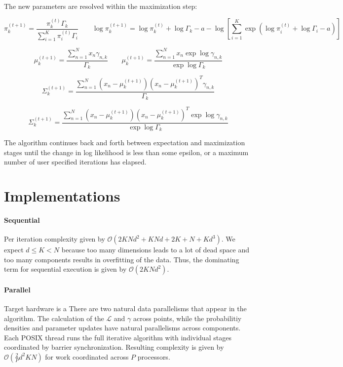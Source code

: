 \documentclass{article}
\newcommand{\boundedBy}[1]{\mathcal{O} \left ( #1 \right )}
\begin{document}
The new parameters are resolved within the maximization step:

\begin{equation}
	\pi_{k}^{(t+1)} = \frac{ \pi_{k}^{(t)} \Gamma_k }{ \sum_{i=1}^{K} \pi_{i}^{(t)} \Gamma_i }
	\qquad
	\log \pi_{k}^{(t+1)} = \log \pi_{k}^{(t)} + \log \Gamma_k - a - \log \left [ \sum_{i=1}^{K} \exp{ \left( \log \pi_{i}^{(t)} + \log \Gamma_i - a \right )} \right ]
\end{equation}

\begin{equation}
	\mu_k^{(t+1)} = \frac{ \sum_{n=1}^{N} x_n \gamma_{n, k} }{ \Gamma_k  }
	\qquad
	\mu_k^{(t+1)} = \frac{ \sum_{n=1}^{N} x_n \exp{ \log \gamma_{n, k} } }{ \exp{ \log \Gamma_k }  }
\end{equation}

\begin{equation}
	\Sigma_k^{(t+1)} = \frac{ \sum_{n=1}^{N} (x_n - \mu_k^{(t+1)}) (x_n - \mu_k^{(t+1)})^T \gamma_{n, k} }{ \Gamma_k  }
\end{equation}

\begin{equation}
	\Sigma_k^{(t+1)} = \frac{ \sum_{n=1}^{N} (x_n - \mu_k^{(t+1)}) (x_n - \mu_k^{(t+1)})^T \exp \log \gamma_{n, k} }{ \exp \log \Gamma_k  }
\end{equation}

The algorithm continues back and forth between expectation and maximization stages until the change in log likelihood is less than some epsilon, or a maximum number of user specified iterations has elapsed.

\section{Implementations}

\paragraph{Sequential} Per iteration complexity given by $\boundedBy{2 K N d^2 + K N d + 2K + N + K d^3}$. We expect $d \le K < N$ because too many dimensions leads to a lot of dead space and too many components results in overfitting of the data. Thus, the dominating term for sequential execution is given by $\boundedBy{ 2 K N d^2 }$. 

\paragraph{Parallel} Target hardware is a There are two natural data parallelisms that appear in the algorithm. The calculation of the $\mathcal{L}$ and $\gamma$ across points, while the probabilitiy densities and parameter updates have natural parallelisms across components. Each POSIX thread runs the full iterative algorithm with individual stages coordinated by barrier synchronization. Resulting complexity is given by $\mathcal{O}\left(\frac{2}{P} d^2 K N \right)$ for work coordinated across $P$ processors.
\end{document}
